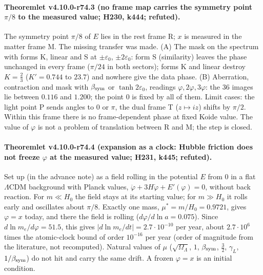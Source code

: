 \paragraph{Theoremlet v4.10.0-r74.3 (no frame map carries the symmetry point \(\pi/8\) to the measured value; H230, k444; refuted).}
The symmetry point \(\pi/8\) of \(E\) lies in the rest frame R; \(x\) is measured in the matter frame M.  The missing transfer was made.
(A) The mask on the spectrum with forms K, linear and S at \(\pm\varepsilon_0\), \(\pm2\varepsilon_0\): form S (similarity) leaves the phase
unchanged in every frame (\(\pi/24\) in both sectors); forms K and linear destroy \(K=\tfrac23\) (\(K'=0.744\) to \(23.7\)) and nowhere give the
data phase.  (B) Aberration, contraction and mask with \(\beta_{\rm sym}\) or \(\tanh2\varepsilon_0\), readings \(\varphi,2\varphi,3\varphi\):
the \(36\) images lie between \(0.116\) and \(1.200\); the point \(0\) is fixed by all of them.  Limit cases: the light point P sends angles to
\(0\) or \(\pi\), the dual frame T (\(z\mapsto iz\)) shifts by \(\pi/2\).  Within this frame there is no frame-dependent phase at fixed Koide
value.  The value of \(\varphi\) is not a problem of translation between R and M; the step is closed.

\paragraph{Theoremlet v4.10.0-r74.4 (expansion as a clock: Hubble friction does not freeze \(\varphi\) at the measured value; H231, k445; refuted).}
Set up (in the advance note) as a field rolling in the potential \(E\) from \(0\) in a flat \(\Lambda\)CDM background with Planck values,
\(\ddot\varphi+3H\dot\varphi+E'(\varphi)=0\), without back reaction.  For \(m\ll H_0\) the field stays at its starting value; for \(m\gg H_0\) it rolls
early and oscillates about \(\pi/8\).  Exactly one mass, \(\mu^*=m/H_0=0.9721\), gives \(\varphi=x\) today, and there the field is rolling
(\(d\varphi/d\ln a=0.075\)).  Since \(d\ln m_e/d\varphi=51.5\), this gives \(|d\ln m_e/dt|=2.7\cdot10^{-10}\) per year, about \(2.7\cdot10^6\) times
the atomic-clock bound of order \(10^{-16}\) per year (order of magnitude from the literature, not recomputed).  Natural values of \(\mu\)
(\(\sqrt{\Omega_\Lambda}\), \(1\), \(\beta_{\rm sym}\), \(\tfrac32\), \(\gamma_L\), \(1/\beta_{\rm sym}\)) do not hit and carry the same drift.  A frozen
\(\varphi=x\) is an initial condition.

